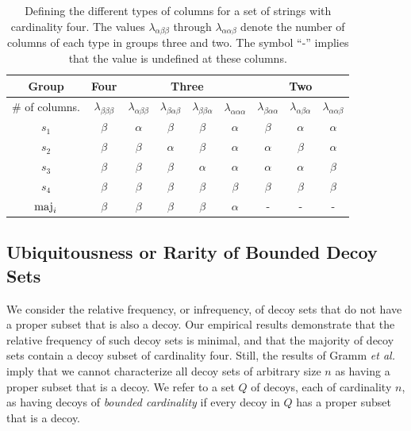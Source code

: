 \begin{table}[t]
\begin{center}
\begin{tabular}{|c|c|cccc|ccc|}
\hline
Group & 
\multicolumn{1}{c|}{Four} &
\multicolumn{4}{c|}{Three} &
\multicolumn{3}{c|}{Two} \\
\hline
\# of columns. &  $\lambda_{\beta\beta\beta}$ & $\lambda_{\alpha\beta\beta}$ & $\lambda_{\beta\alpha\beta}$ & $\lambda_{\beta\beta\alpha}$ & $\lambda_{\alpha\alpha\alpha}$ & $\lambda_{\beta\alpha\alpha}$ & $\lambda_{\alpha\beta\alpha}$ &   $\lambda_{\alpha\alpha\beta}$\\
\hline
$s_1$ 		& $\beta$ & $\alpha$ & $\beta$ & $\beta$ & $\alpha$ & $\beta$ & $\alpha$ & $\alpha$ \\
$s_2$ 		& $\beta$ & $\beta$ & $\alpha$ & $\beta$ & $\alpha$ & $\alpha$ & $\beta$ & $\alpha$ \\
$s_3$ 		& $\beta$ & $\beta$ & $\beta$ & $\alpha$ & $\alpha$ & $\alpha$ & $\alpha$ & $\beta$ \\
$s_4$ 		& $\beta$ & $\beta$ & $\beta$ & $\beta$ & $\beta$ & $\beta$ & $\beta$ & $\beta$ \\
\hline
$\operatorname{maj}_i$ & $\beta$ & $\beta$ & $\beta$& $\beta$ & $\alpha$ & - & - & - \\
\hline
\end{tabular}
\caption[Defining the different types of columns for a set of strings with cardinality four.]{Defining the different types of columns for a set of strings with cardinality four. The values $\lambda_{\alpha\beta\beta}$ through $\lambda_{\alpha\alpha\beta}$ denote the number of columns of each type in
groups three and two.  The symbol ``-'' implies that the value is undefined at these columns.}
\end{center}
\label{tab:possible_columns}
\end{table}

\subsection{Ubiquitousness or Rarity of Bounded Decoy Sets}

We consider the relative frequency, or infrequency, of decoy sets that do not have a proper subset that is also a decoy. Our empirical results demonstrate that the relative frequency of such decoy sets is minimal, and that the majority of decoy sets contain a decoy subset of cardinality four.  Still, the results of Gramm {\em et al.}\ \cite{GNR03} imply that we cannot characterize all decoy sets of arbitrary size $n$ as having a proper subset that is a decoy. We refer to a set $Q$ of decoys, each of cardinality $n$,  as having decoys of {\em bounded cardinality} if every decoy in $Q$ has a proper subset that is a decoy.
  
